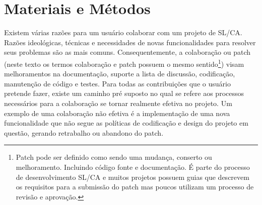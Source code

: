 % 
% 
% 
% 

\section{Materiais e Métodos} \label{sec:materiais}


Existem várias razões para um usuário colaborar com um projeto de SL/CA. Razões ideológicas, técnicas e necessidades de novas funcionalidades para resolver seus problemas são as mais comuns. Consequentemente, a colaboração ou patch (neste texto os termos colaboração e patch possuem o mesmo sentido\footnote{Patch pode ser definido como sendo uma mudança, conserto ou melhoramento. Incluindo código fonte e documentação. É parte do processo de desenvolvimento SL/CA e muitos projetos possuem guias que descrevem os requisitos para a submissão do patch mas poucos utilizam um processo de revisão e aprovação.\cite{preliminary}}) visam melhoramentos na documentação, suporte a lista de discussão, codificação, manutenção de código e testes. Para todas as contribuições que o usuário pretende fazer, existe um caminho pré suposto no qual se refere aos processos necessários para a colaboração se tornar realmente efetiva no projeto. Um exemplo de uma colaboração não efetiva é a implementação de uma nova funcionalidade que não segue as políticas de codificação e design do projeto em questão, gerando retrabalho ou abandono do patch.


